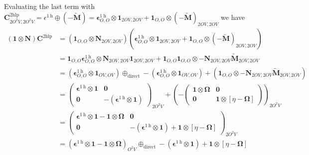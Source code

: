 Evaluating the last term with $\bm{C}^{2\mathrm{hlp}}_{2O^2V,2O^2V} = \epsilon^{1 \mathrm{~h}} \oplus (-\bm{\tilde{M}}) = \bm{\epsilon}^{1 \mathrm{~h}}_{O,O} \otimes \bm{1}_{2OV,2OV} + \bm{1}_{O,O} \otimes (-\bm{\tilde{M}})_{2OV,2OV}$ we have
\begin{align}
 \left( \bm{1} \otimes \bm{N} \right)\bm{C}^{2\mathrm{hlp}} &= \left( \bm{1}_{O,O} \otimes \bm{N}_{2OV,2OV} \right) \left( \bm{\epsilon}^{1 \mathrm{~h}}_{O,O} \otimes \bm{1}_{2OV,2OV} + \bm{1}_{O,O} \otimes (-\bm{\tilde{M}})_{2OV,2OV} \right)\\
&= \bm{1}_{O,O} \bm{\epsilon}^{1 \mathrm{~h}}_{O,O} \otimes \bm{N}_{2OV,2OV} \bm{1}_{2OV,2OV} + \bm{1}_{O,O} \bm{1}_{O,O} \otimes -\bm{N}_{2OV,2OV} \bm{\tilde{M}}_{2OV,2OV}\\
&= \left( \bm{\epsilon}^{1 \mathrm{~h}}_{O,O} \otimes \bm{1}_{OV,OV} \right) \oplus_{\text{direct}} -\left( \bm{\epsilon}^{1 \mathrm{~h}}_{O,O} \otimes \bm{1}_{OV,OV} \right) + \left( \bm{1}_{O,O} \otimes -\bm{N}_{2OV,2OV} \bm{\tilde{M}}_{2OV,2OV} \right)\\
&= \begin{pmatrix}
\bm{\epsilon}^{1 \mathrm{~h}} \otimes \bm{1} & \bm{0} \\
\bm{0} & -\left(\bm{\epsilon}^{1 \mathrm{~h}} \otimes \bm{1}\right)
\end{pmatrix}_{2O^2V} + \left(  -\begin{pmatrix}\bm{1} \otimes\bm{\Omega} & \bm{0} \\ \bm{0} & \bm{1} \otimes \left[\eta -\bm{\Omega}\right]\end{pmatrix} \right)_{2O^2V}\\
&= \begin{pmatrix}
\bm{\epsilon}^{1 \mathrm{~h}} \otimes \bm{1} - \bm{1} \otimes \bm{\Omega} & \bm{0} \\
\bm{0} & -\left(\bm{\epsilon}^{1 \mathrm{~h}} \otimes \bm{1}\right) + \bm{1} \otimes \left[\eta -\bm{\Omega}\right]
\end{pmatrix}_{2O^2V}\\
&= \left( \bm{\epsilon}^{1 \mathrm{~h}} \otimes \bm{1} -\bm{1} \otimes \bm{\Omega} \right)_{O^2V} \oplus_{\text{direct}} -\left(\bm{\epsilon}^{1 \mathrm{~h}} \otimes \bm{1}\right) + \bm{1} \otimes \left[\eta -\bm{\Omega}\right]\\
\end{align}

